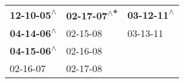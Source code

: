 \begin{supertabular}{lll}
 \textbf{12-10-05\textsuperscript{$\wedge$}} &  \textbf{02-17-07\textsuperscript{$\wedge$*}} &  \textbf{03-12-11\textsuperscript{$\wedge$}} \\
 \textbf{04-14-06\textsuperscript{$\wedge$}} &                    02-15-08\textsuperscript{} &                   03-13-11\textsuperscript{} \\
 \textbf{04-15-06\textsuperscript{$\wedge$}} &                    02-16-08\textsuperscript{} &                                              \\
                  02-16-07\textsuperscript{} &                    02-17-08\textsuperscript{} &                                              \\
\end{supertabular}
